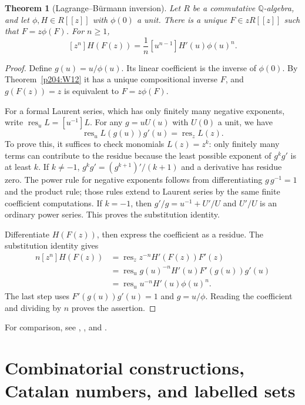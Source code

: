 \documentclass[11pt,oneside,openany]{book}
\theoremstyle{plain}
\newtheorem{theorem}{Theorem}[chapter]
\theoremstyle{definition}
\theoremstyle{remark}
\begin{document}
\begin{theorem}[Lagrange--Bürmann inversion]\label{p204:W18}
Let \(R\) be a commutative \(\mathbb Q\)-algebra, and let
\(\phi,H\in R[[z]]\) with \(\phi(0)\) a unit.
There is a unique \(F\in zR[[z]]\) such that \(F=z\phi(F)\).
For \(n\ge1\),
\[
 [z^n]H(F(z))=\frac{1}{n}[u^{n-1}]H'(u)\phi(u)^n .
\]
\end{theorem}
\begin{proof}
Define \(g(u)=u/\phi(u)\). Its linear coefficient is the inverse
of \(\phi(0)\). By Theorem~\ref{p204:W12} it has a unique
compositional inverse \(F\), and \(g(F(z))=z\) is equivalent
to \(F=z\phi(F)\).

For a formal Laurent series, which has only finitely many negative
exponents, write \(\operatorname{res}_u L=[u^{-1}]L\).
For any \(g=uU(u)\) with \(U(0)\) a unit, we have
\[
 \operatorname{res}_u L(g(u))g'(u)=\operatorname{res}_z L(z).
\]
To prove this, it suffices to check monomials \(L(z)=z^k\):
only finitely many terms can contribute to the residue because
the least possible exponent of \(g^k g'\) is at least \(k\).
If \(k\ne-1\), \(g^k g'=(g^{k+1})'/(k+1)\) and a derivative
has residue zero. The power rule for negative exponents follows
from differentiating \(g\,g^{-1}=1\) and the product rule;
those rules extend to Laurent series by the same finite
coefficient computations. If \(k=-1\), then
\(g'/g=u^{-1}+U'/U\) and \(U'/U\) is an ordinary power series.
This proves the substitution identity.

Differentiate \(H(F(z))\), then express the coefficient as a residue.
The substitution identity gives
\[
\begin{aligned}
 n[z^n]H(F(z))
 &=\operatorname{res}_z z^{-n}H'(F(z))F'(z)\\
 &=\operatorname{res}_u g(u)^{-n}H'(u)F'(g(u))g'(u)\\
 &=\operatorname{res}_u u^{-n}H'(u)\phi(u)^n .
\end{aligned}
\]
The last step uses \(F'(g(u))g'(u)=1\) and \(g=u/\phi\).
Reading the coefficient and dividing by \(n\) proves the assertion.
\end{proof}

For comparison, see \cite[Chapter 7]{GKP},
\cite[Sections 4.1, 4.3, and 4.7]{Stanley}, and
\cite[Appendix A.6]{FS}.
\chapter[Combinatorial constructions]{Combinatorial constructions, Catalan numbers, and labelled sets}
\label{p204:ch03}
\end{document}
